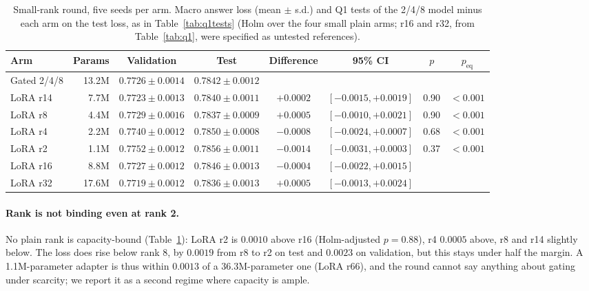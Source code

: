 \documentclass[11pt]{article}
\begin{document}
\begin{table}[t]
\centering
\caption{Small-rank round, five seeds per arm. Macro answer loss (mean $\pm$ s.d.) and Q1 tests
of the 2/4/8 model minus each arm on the test loss, as in Table~\ref{tab:q1tests} (Holm over the
four small plain arms; r16 and r32, from Table~\ref{tab:q1}, were specified as untested
references).}
\label{tab:small}
\small\setlength{\tabcolsep}{4pt}
\begin{tabular}{lrcccccc}
\toprule
Arm & Params & Validation & Test & Difference & 95\% CI & $p$ & $p_{\mathrm{eq}}$ \\
\midrule
Gated 2/4/8 & 13.2M & $0.7726 \pm 0.0014$ & $0.7842 \pm 0.0012$ & & & & \\
LoRA r14    &  7.7M & $0.7723 \pm 0.0013$ & $0.7840 \pm 0.0011$ & $+0.0002$ & $[-0.0015, +0.0019]$ & 0.90 & $<0.001$ \\
LoRA r8     &  4.4M & $0.7729 \pm 0.0016$ & $0.7837 \pm 0.0009$ & $+0.0005$ & $[-0.0010, +0.0021]$ & 0.90 & $<0.001$ \\
LoRA r4     &  2.2M & $0.7740 \pm 0.0012$ & $0.7850 \pm 0.0008$ & $-0.0008$ & $[-0.0024, +0.0007]$ & 0.68 & $<0.001$ \\
LoRA r2     &  1.1M & $0.7752 \pm 0.0012$ & $0.7856 \pm 0.0011$ & $-0.0014$ & $[-0.0031, +0.0003]$ & 0.37 & $<0.001$ \\
\midrule
LoRA r16    &  8.8M & $0.7727 \pm 0.0012$ & $0.7846 \pm 0.0013$ & $-0.0004$ & $[-0.0022, +0.0015]$ & & \\
LoRA r32    & 17.6M & $0.7719 \pm 0.0012$ & $0.7836 \pm 0.0013$ & $+0.0005$ & $[-0.0013, +0.0024]$ & & \\
\bottomrule
\end{tabular}
\end{table}

\paragraph{Rank is not binding even at rank 2.} No plain rank is capacity-bound
(Table~\ref{tab:small}): LoRA r2 is $0.0010$ above r16 (Holm-adjusted $p=0.88$), r4 $0.0005$
above, r8 and r14 slightly below. The loss does rise below rank 8, by $0.0019$ from r8 to r2 on
test and $0.0023$ on validation, but this stays under half the margin. A 1.1M-parameter adapter
is thus within $0.0013$ of a 36.3M-parameter one (LoRA r66), and the round cannot say anything
about gating under scarcity; we report it as a second regime where capacity is ample.
\end{document}

